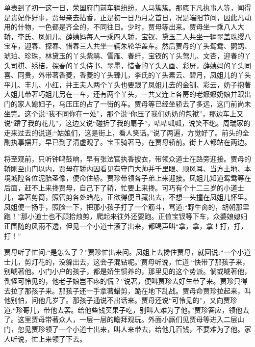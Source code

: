 \begin{parag}
    单表到了初一这一日，荣国府门前车辆纷纷，人马簇簇。那底下凡执事人等，闻得是贵妃作好事，贾母亲去拈香，正是初一日乃月之首日，况是端阳节间，因此凡动用的什物，一色都是齐全的，不同往日。少时，贾母等出来。贾母坐一乘八人大轿，李氏、凤姐儿、薛姨妈每人一乘四人轿，宝钗、黛玉二人共坐一辆翠盖珠缨八宝车，迎春、探春、惜春三人共坐一辆朱轮华盖车。然后贾母的丫头鸳鸯、鹦鹉、琥珀、珍珠，林黛玉的丫头紫鹃、雪雁、春纤，宝钗的丫头莺儿、文杏，迎春的丫头司棋、绣桔，探春的丫头侍书、翠墨，惜春的丫头入画、彩屏，薛姨妈的丫头同喜、同贵，外带著香菱，香菱的丫头臻儿，李氏的丫头素云、碧月，凤姐儿的丫头平儿、丰儿、小红，并王夫人两个丫头也要跟了凤姐儿去的金钏、彩云，奶子抱著大姐儿带著巧姐儿另在一车，还有两个丫头，一共又连上各房的老嬷嬷奶娘并跟出门的家人媳妇子，乌压压的占了一街的车。贾母等已经坐轿去了多远，这门前尚未坐完。这个说“我不同你在一处”，那个说“你压了我们奶奶的包袱”，那边车上又说“蹭了我的花儿”，这边又说“碰折了我的扇子”，咭咭呱呱，说笑不绝。周瑞家的走来过去的说道:“姑娘们，这是街上，看人笑话。”说了两遍，方觉好了。前头的全副执事摆开，早已到了清虚观了。宝玉骑著马，在贾母轿前。街上人都站在两边。
\end{parag}


\begin{parag}
    将至观前，只听钟鸣鼓响，早有张法官执香披衣，带领众道士在路旁迎接。贾母的轿刚至山门以内，贾母在轿内因看见有守门大帅并千里眼、顺风耳、当方土地、本境城隍各位泥胎圣像，便命住轿。贾珍带领各子弟上来迎接。凤姐儿知道鸳鸯等在后面，赶不上来搀贾母，自己下了轿，忙要上来搀。可巧有个十二三岁的小道士儿，拿著剪筒，照管剪各处蜡花，正欲得便且藏出去，不想一头撞在凤姐儿怀里。凤姐便一扬手，照脸一下，把那小孩子打了一个筋斗，骂道:“野牛肏的，胡朝那里跑！”那小道士也不顾拾烛剪，爬起来往外还要跑。正值宝钗等下车，众婆娘媳妇正围随的风雨不透，但见一个小道士滚了出来，都喝声叫“拿，拿，拿！打，打，打！”
\end{parag}


\begin{parag}
    贾母听了忙问:“是怎么了？”贾珍忙出来问。凤姐上去搀住贾母，就回说:“一个小道士儿，剪灯花的，没躲出去，这会子混钻呢。”贾母听说，忙道:“快带了那孩子来，别唬著他。小门小户的孩子，都是娇生惯养的，那里见的这个势派。倘或唬著他，倒怪可怜见的，他老子娘岂不疼的慌？”说著，便叫贾珍去好生带了来。贾珍只得去拉了那孩子来。那孩子还一手拿著蜡剪，跪在地下乱战。贾母命贾珍拉起来，叫他别怕，问他几岁了。那孩子通说不出话来。贾母还说“可怜见的”，又向贾珍道:“珍哥儿，带他去罢。给他些钱买果子吃，别叫人难为了他。”贾珍答应，领他去了。这里贾母带著众人，一层一层的瞻拜观玩。外面小厮们见贾母等进入二层山门，忽见贾珍领了一个小道士出来，叫人来带去，给他几百钱，不要难为了他。家人听说，忙上来领了下去。
\end{parag}


